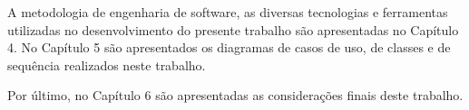 A metodologia de engenharia de software, as diversas tecnologias e ferramentas utilizadas no desenvolvimento do presente trabalho são apresentadas no Capítulo 4. No Capítulo 5 são apresentados os diagramas de casos de uso, de classes e de sequência realizados neste trabalho.

Por último, no Capítulo 6 são apresentadas as considerações finais deste trabalho.





